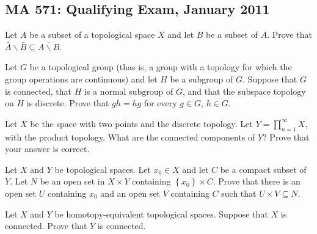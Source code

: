 \subsection{MA 571: Qualifying Exam, January 2011}
\setcounter{exercise}{0}

\begin{problem}
Let $A$ be a subset of a topological space $X$ and let $B$ be a subset of
$A$. Prove that $\bar A\smallsetminus\bar B\subseteq\overline{A\smallsetminus B}$.
\end{problem}
\begin{solution}
\end{solution}

\begin{problem}
Let $G$ be a topological group (thas is, a group with a topology for which
the group operations are continuous) and let $H$ be a subgroup of
$G$. Suppose that $G$ is connected, that $H$ is a normal subgroup of $G$,
and that the subspace topology on $H$ is discrete. Prove that $gh=hg$ for
every $g\in G$, $h\in G$.
\end{problem}
\begin{solution}
\end{solution}

\begin{problem}
Let $X$ be the space with two points and the discrete topology. Let
$Y=\prod_{n=1}^\infty X$, with the product topology. What are the connected
components of $Y$? Prove that your answer is correct.
\end{problem}
\begin{solution}
\end{solution}

\begin{problem}
Let $X$ and $Y$ be topological spaces. Let $x_0\in X$ and let $C$ be a
compact subset of $Y$. Let $N$ be an open set in $X\times Y$ containing
$\left\{x_0\right\}\times C$. Prove that there is an open set $U$
containing $x_0$ and an open set $V$ containing $C$ such that $U\times
V\subseteq N$.
\end{problem}
\begin{solution}
\end{solution}

\begin{problem}
Let $X$ and $Y$ be homotopy-equivalent topological spaces. Suppose that $X$
is connected. Prove that $Y$ is connected.
\end{problem}
\begin{solution}
\end{solution}

